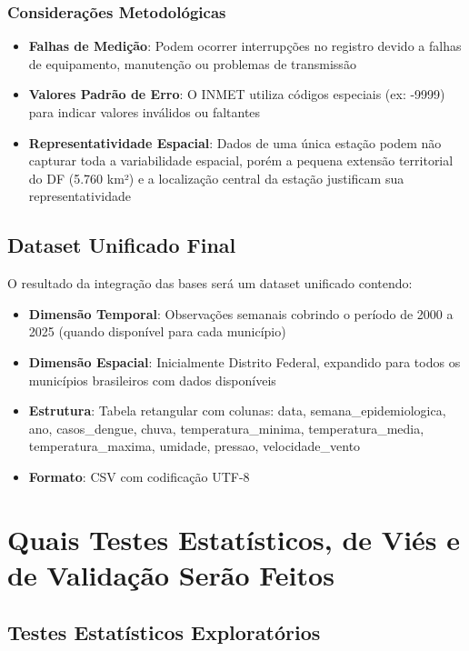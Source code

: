 \subsubsection{Considerações Metodológicas}

\begin{itemize}
    \item \textbf{Falhas de Medição}: Podem ocorrer interrupções no registro devido a falhas de equipamento, manutenção ou problemas de transmissão
    \item \textbf{Valores Padrão de Erro}: O INMET utiliza códigos especiais (ex: -9999) para indicar valores inválidos ou faltantes
    \item \textbf{Representatividade Espacial}: Dados de uma única estação podem não capturar toda a variabilidade espacial, porém a pequena extensão territorial do DF (5.760 km²) e a localização central da estação justificam sua representatividade
\end{itemize}

\subsection{Dataset Unificado Final}

O resultado da integração das bases será um dataset unificado contendo:
\begin{itemize}
    \item \textbf{Dimensão Temporal}: Observações semanais cobrindo o período de 2000 a 2025 (quando disponível para cada município)
    \item \textbf{Dimensão Espacial}: Inicialmente Distrito Federal, expandido para todos os municípios brasileiros com dados disponíveis
    \item \textbf{Estrutura}: Tabela retangular com colunas: data, semana\_epidemiologica, ano, casos\_dengue, chuva, temperatura\_minima, temperatura\_media, temperatura\_maxima, umidade, pressao, velocidade\_vento
    \item \textbf{Formato}: CSV com codificação UTF-8
\end{itemize}

\section{Quais Testes Estatísticos, de Viés e de Validação Serão Feitos}

\subsection{Testes Estatísticos Exploratórios}

